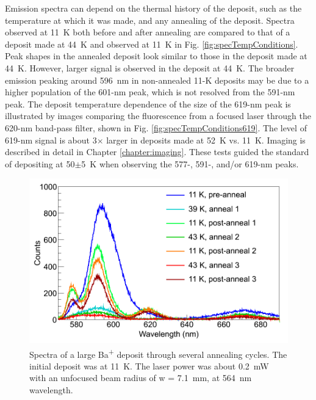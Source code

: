 Emission spectra can depend on the thermal history of the deposit, such as the temperature at which it was made, and any annealing of the deposit.  Spectra observed at 11~K both before and after annealing are compared to that of a deposit  made at 44~K and observed at 11~K in Fig. \ref{fig:specTempConditions}.  Peak shapes in the annealed deposit look similar to those in the deposit made at 44~K.  However, larger signal is observed in the deposit at 44~K.  The broader emission peaking around 596~nm in non-annealed 11-K deposits may be due to a higher population of the 601-nm peak, which is not resolved from the 591-nm peak.  The deposit temperature dependence of the size of the 619-nm peak is illustrated by images comparing the fluorescence from a focused laser through the 620-nm band-pass filter, shown in Fig. \ref{fig:specTempConditions619}.  The level of 619-nm signal is about 3$\times$ larger in deposits made at 52~K vs. 11~K.  Imaging is described in detail in Chapter \ref{chapter:imaging}.  These tests guided the standard of depositing at 50$\pm$5~K when observing the 577-, 591-, and/or 619-nm peaks.







\begin{figure} %
        \centering
                \includegraphics[width=.7\textwidth]{figures/spectra_annealing.png}
                \caption{Spectra of a large Ba\textsuperscript{+} deposit through several annealing cycles.  The initial deposit was at 11~K.  The laser power was about 0.2~mW with an unfocused beam radius of w = 7.1~mm, at 564~nm wavelength.  \cite{Mong2015}}
\label{fig:specAnneal}
\end{figure}

